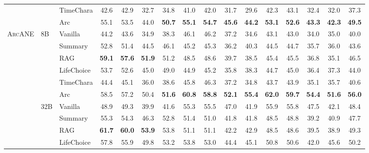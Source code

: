 \documentclass{llmxive}
\providecommand{\ours}{\textsc{ArcANE}}
\begin{document}
\begin{table}[t]
\begin{tabular}{lllccccccccccccc}
 &  & TimeChara & 42.6 & 42.9 & 32.7 & 34.8 & 41.0 & 42.0 & 31.7 & 29.6 & 42.3 & 43.1 & 32.4 & 32.0 & 37.3 \\
 &  & \cellcolor{yellow!15} Arc & \cellcolor{yellow!15} 55.1 & \cellcolor{yellow!15} 53.5 & \cellcolor{yellow!15} 44.0 & \cellcolor{yellow!15} \textbf{50.7} & \cellcolor{yellow!15} \textbf{55.1} & \cellcolor{yellow!15} \textbf{54.7} & \cellcolor{yellow!15} \textbf{45.6} & \cellcolor{yellow!15} \textbf{44.2} & \cellcolor{yellow!15} \textbf{53.1} & \cellcolor{yellow!15} \textbf{52.6} & \cellcolor{yellow!15} \textbf{43.3} & \cellcolor{yellow!15} \textbf{42.3} & \cellcolor{yellow!15} \textbf{49.5} \\
\midrule
\multirow[t]{12}{*}{\ours{}} & \multirow[t]{6}{*}{8B} & Vanilla & 44.2 & 43.6 & 34.9 & 38.3 & 46.1 & 46.2 & 37.2 & 34.6 & 43.1 & 43.0 & 34.0 & 35.0 & 40.0 \\
 &  & Summary & 52.8 & 51.4 & 44.5 & 46.1 & 45.2 & 45.3 & 36.2 & 40.3 & 44.5 & 44.7 & 35.7 & 36.0 & 43.6 \\
 &  & RAG & \textbf{59.1} & \textbf{57.6} & \textbf{51.9} & 51.2 & 48.5 & 48.6 & 39.7 & 38.5 & 45.4 & 45.5 & 36.8 & 35.1 & 46.5 \\
 &  & LifeChoice & 53.7 & 52.6 & 45.0 & 49.0 & 44.9 & 45.2 & 35.8 & 38.3 & 44.7 & 45.0 & 36.4 & 37.3 & 44.0 \\
 &  & TimeChara & 44.4 & 45.1 & 36.0 & 38.6 & 45.8 & 46.3 & 37.2 & 34.8 & 43.7 & 43.9 & 35.1 & 35.7 & 40.6 \\
 &  & \cellcolor{yellow!15} Arc & \cellcolor{yellow!15} 58.5 & \cellcolor{yellow!15} 57.2 & \cellcolor{yellow!15} 50.4 & \cellcolor{yellow!15} \textbf{51.6} & \cellcolor{yellow!15} \textbf{60.8} & \cellcolor{yellow!15} \textbf{58.8} & \cellcolor{yellow!15} \textbf{52.1} & \cellcolor{yellow!15} \textbf{55.4} & \cellcolor{yellow!15} \textbf{62.0} & \cellcolor{yellow!15} \textbf{59.7} & \cellcolor{yellow!15} \textbf{54.4} & \cellcolor{yellow!15} \textbf{51.6} & \cellcolor{yellow!15} \textbf{56.0} \\
\cmidrule(l){2-16}
 & \multirow[t]{6}{*}{32B} & Vanilla & 48.9 & 49.3 & 39.9 & 41.6 & 55.3 & 55.5 & 47.0 & 41.9 & 55.9 & 55.8 & 47.5 & 42.1 & 48.4 \\
 &  & Summary & 55.3 & 54.3 & 46.3 & 52.8 & 51.4 & 51.0 & 41.8 & 41.8 & 48.5 & 48.8 & 39.2 & 40.9 & 47.7 \\
 &  & RAG & \textbf{61.7} & \textbf{60.0} & \textbf{53.9} & 53.8 & 51.1 & 51.1 & 42.2 & 42.9 & 48.5 & 48.6 & 39.5 & 38.9 & 49.3 \\
 &  & LifeChoice & 57.8 & 55.9 & 49.8 & 53.2 & 53.8 & 53.0 & 44.4 & 45.1 & 50.8 & 50.6 & 42.0 & 45.6 & 50.2 \\

\end{tabular}
\end{table}
\end{document}
